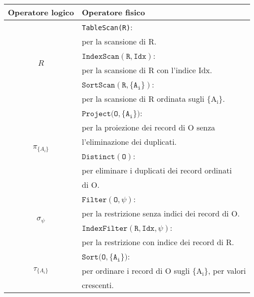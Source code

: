 \begin{table}[H]
	\centering
	\begin{tabular}{|c|l|}
		\hline
		Operatore logico                    & Operatore fisico                                                \\\hline\hline
		\multirow{6}{2em}{$R$}              & \texttt{TableScan(R)}:                                          \\
		                                    & per la scansione di R.                                          \\\cline{2-2}
		                                    & $\mathtt{IndexScan(R, Idx)}$:                                   \\
		                                    & per la scansione di R con l'indice Idx.                         \\\cline{2-2}
		                                    & $\mathtt{SortScan(R, \{A_i\})}$:                                \\
		                                    & per la scansione di R ordinata sugli $\mathrm{\{A_i\}}$.        \\\hline
		\multirow{6}{3em}{$\pi_{\{A_i\}}$}  & $\mathtt{Project(O, \{A_i\}})$:                                 \\
		                                    & per la proiezione dei record di O senza                         \\
		                                    & l'eliminazione dei duplicati.                                   \\\cline{2-2}
		                                    & $\mathtt{Distinct(O)}$:                                         \\
		                                    & per eliminare i duplicati dei record ordinati                   \\
		                                    & di O.                                                           \\\hline
		\multirow{4}{2em}{$\sigma_\psi$}    & $\mathtt{Filter(O, \psi)}$:                                     \\
		                                    & per la restrizione senza indici dei record di O.                \\\cline{2-2}
		                                    & $\mathtt{IndexFilter(R, Idx, \psi)}$:                           \\
		                                    & per la restrizione con indice dei record di R.                  \\\hline
		\multirow{3}{2em}{$\tau_{\{A_i\}}$} & $\mathtt{Sort(O, \{A_i\}})$:                                    \\
		                                    & per ordinare i record di O sugli $\mathrm{\{A_i\}}$, per valori \\
		                                    & crescenti.                                                      \\\hline
	\end{tabular}
\end{table}

